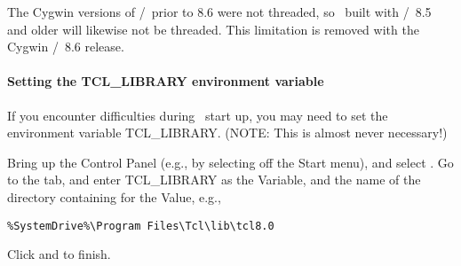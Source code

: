 The Cygwin versions of \Tcl/\Tk\ prior to 8.6 were not threaded, so
\OOMMF\ built with \Tcl/\Tk\ 8.5 and older will likewise not be
threaded.  This limitation is removed with the Cygwin \Tcl/\Tk\ 8.6
release.

\paragraph{Setting the TCL\_LIBRARY environment variable}

If you encounter difficulties during \OOMMF\ start up, you may need to set
the environment variable 
TCL\_LIBRARY.  (NOTE: This
is almost never necessary!)

Bring up the Control Panel (e.g., by selecting 
 off the Start menu), and select 
.  Go to the  tab, and enter
TCL\_LIBRARY as the Variable, and the name of the directory containing
 for the Value, e.g.,
\begin{verbatim}
%SystemDrive%\Program Files\Tcl\lib\tcl8.0
\end{verbatim}
Click  and  to finish.



